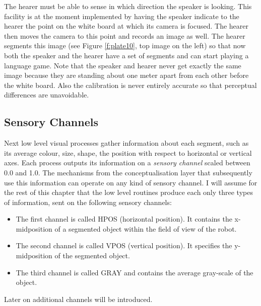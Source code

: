 The hearer must be able to sense in which direction the speaker is looking. 
This facility is at the moment implemented by having 
the speaker indicate to the hearer the point on the white board 
at which its camera is focused. The hearer then moves the camera
to this point and records an image as well. The hearer segments 
this image (see Figure \ref{f:plate10}, top image on the left) so that 
now both the speaker 
and the hearer have a set of segments and can start playing 
a language game. Note that the speaker and hearer never get 
exactly the same image because they are standing about one 
meter apart from each other before the white board. Also the
calibration is never entirely accurate so that perceptual 
differences are unavoidable.

\subsection{Sensory Channels}

Next low level visual processes gather information about each 
segment, such as its average colour, size, shape,
the position with respect to horizontal or vertical axes. 
Each process outputs its information on a {\it sensory 
channel} scaled between 0.0 and 1.0. The mechanisms from 
the conceptualisation layer that subsequently use this information
can operate on any kind of sensory channel. 
I will assume for the rest of this chapter that the low level
routines produce each only three types of information, sent
on the following sensory channels: 
\begin{itemize}
\item The first channel is called HPOS (horizontal position). 
It contains the x-midposition of a segmented object within
the field of view of the robot. 
\item The second channel is called VPOS (vertical position). It
specifies the y-midposition of the segmented object. 
\item The third channel is called GRAY and contains 
the average gray-scale of the object. 
\end{itemize}
Later on additional channels will be introduced. 

